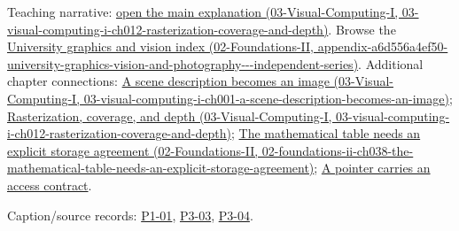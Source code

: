 Teaching narrative: \href{../03-Visual-Computing-I/main.pdf\#nameddest=03-visual-computing-i-ch012-rasterization-coverage-and-depth}{open the main explanation (03-Visual-Computing-I, 03-visual-computing-i-ch012-rasterization-coverage-and-depth)}. Browse the \href{../02-Foundations-II/main.pdf\#nameddest=appendix-a6d556a4ef50-university-graphics-vision-and-photography---independent-series}{University graphics and vision index (02-Foundations-II, appendix-a6d556a4ef50-university-graphics-vision-and-photography-\/-\/-independent-series)}. Additional chapter connections: \href{../03-Visual-Computing-I/main.pdf\#nameddest=03-visual-computing-i-ch001-a-scene-description-becomes-an-image}{A scene description becomes an image (03-Visual-Computing-I, 03-visual-computing-i-ch001-a-scene-description-becomes-an-image)}; \href{../03-Visual-Computing-I/main.pdf\#nameddest=03-visual-computing-i-ch012-rasterization-coverage-and-depth}{Rasterization, coverage, and depth (03-Visual-Computing-I, 03-visual-computing-i-ch012-rasterization-coverage-and-depth)}; \href{../02-Foundations-II/main.pdf\#nameddest=02-foundations-ii-ch038-the-mathematical-table-needs-an-explicit-storage-agreement}{The mathematical table needs an explicit storage agreement (02-Foundations-II, 02-foundations-ii-ch038-the-mathematical-table-needs-an-explicit-storage-agreement)}; \href{Continuous\%20Notes/Computing\%20Foundations\%20-\%20From\%20Bits\%20to\%20C++\%20and\%20Systems\%20APIs\#A\%20pointer\%20carries\%20an\%20access\%20contract}{A pointer carries an access contract}.

Caption/source records: \hyperref[04-visual-computing-ii-ch036-p1-01---module-1.1-course-intro-administrivia-part-1-graphics-visual-computing-2026]{P1-01}, \hyperref[04-visual-computing-ii-ch036-p3-03---moving-objects-in-space]{P3-03}, \hyperref[04-visual-computing-ii-ch036-p3-04---rotations-about-an-arbitrary-axis]{P3-04}.
